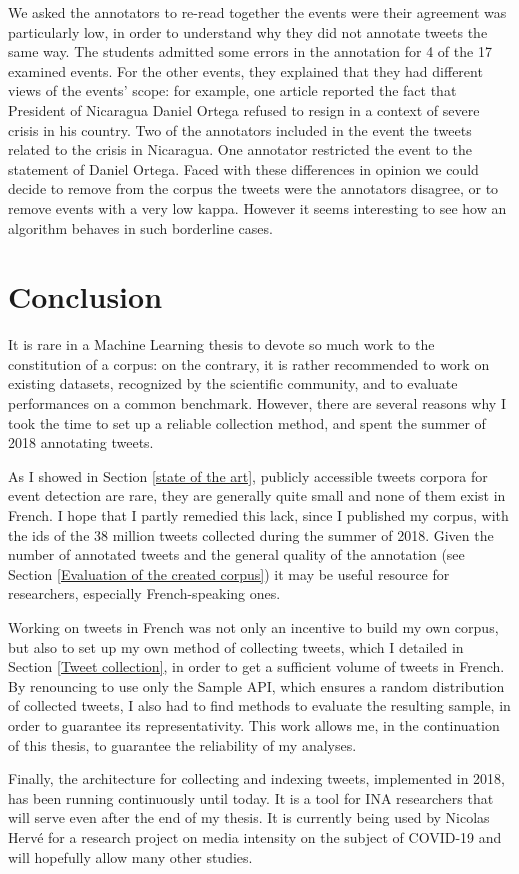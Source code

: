 We asked the annotators to re-read together the events were their agreement was particularly low, in order to understand why they did not annotate tweets the same way. The students admitted some errors in the annotation for 4 of the 17 examined events. For the other events, they explained that they had different views of the events' scope: for example, one article reported the fact that President of Nicaragua Daniel Ortega refused to resign in a context of severe crisis in his country. Two of the annotators included in the event the tweets related to the crisis in Nicaragua. One annotator restricted the event to the statement of Daniel Ortega. Faced with these differences in opinion we could decide to remove from the corpus the tweets were the annotators disagree, or to remove events with a very low kappa. However it seems interesting to see how an algorithm behaves in such borderline cases.


\section{Conclusion}

It is rare in a Machine Learning thesis to devote so much work to the constitution of a corpus: on the contrary, it is rather recommended to work on existing datasets, recognized by the scientific community, and to evaluate  performances on a common benchmark. However, there are several reasons why I took the time to set up a reliable collection method, and spent the summer of 2018 annotating tweets. 

As I showed in Section \ref{state of the art}, publicly accessible tweets corpora for event detection are rare, they are generally quite small and none of them exist in French. I hope that I partly remedied this lack, since I published my corpus, with the ids of the 38 million tweets collected during the summer of 2018. Given the number of annotated tweets and the general quality of the annotation (see Section \ref{Evaluation of the created corpus}) it may be useful resource for researchers, especially French-speaking ones.


Working on tweets in French was not only an incentive to build my own corpus, but also to set up my own method of collecting tweets, which I detailed in Section \ref{Tweet collection}, in order to get a sufficient volume of tweets in French. By renouncing to use only the Sample API, which ensures a random distribution of collected tweets, I also had to find methods to evaluate the resulting sample, in order to guarantee its representativity. This work allows me, in the continuation of this thesis, to guarantee the reliability of my analyses.


Finally, the architecture for collecting and indexing tweets, implemented in 2018, has been running continuously until today. It is a tool for INA researchers that will serve even after the end of my thesis. It is currently being used by Nicolas Hervé for a research project on media intensity on the subject of COVID-19  and will hopefully allow many other studies.